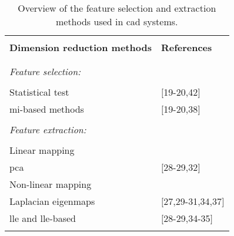 \begin{table}
	\caption{Overview of the feature selection and extraction methods used in \ac{cad} systems.}
	\small
	\renewcommand{\arraystretch}{.8}
	\begin{tabular}{p{.65\linewidth} p{.25\linewidth}}
		\hline \\ [-1.5ex]
		\textbf{Dimension reduction methods} & \textbf{References} \\ \\ [-1.5ex]
		\hline \\ [-1.5ex]
		\textit{Feature selection:} & \\ \\ [-1.5ex]
		\quad Statistical test & $[$19-20,42$]$ \\
		\quad \ac{mi}-based methods & $[$19-20,38$]$ \\ \\ [-1.5ex]
		\textit{Feature extraction:} & \\ \\ [-1.5ex]
		\quad Linear mapping & \\
		\quad \quad \acs{pca} & $[$28-29,32$]$ \\
		\quad Non-linear mapping & \\
		\quad \quad Laplacian eigenmaps & $[$27,29-31,34,37$]$ \\
		\quad \quad \acs{lle} and \acs{lle}-based & $[$28-29,34-35$]$ \\ \\ [-1.5ex]
		\hline
	\end{tabular}
	\label{tab:featext}
\end{table} 

